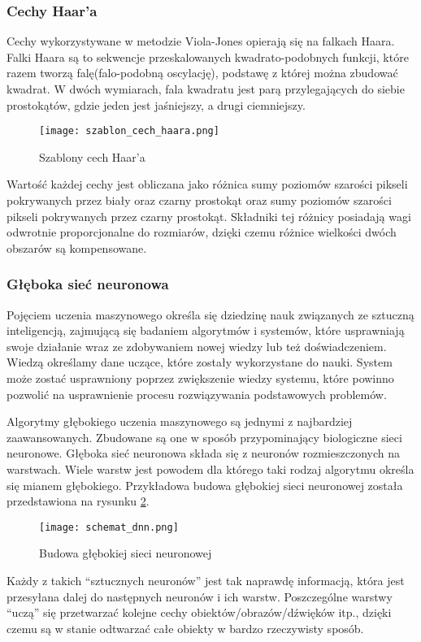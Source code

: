 \subsubsection{Cechy Haar'a}
Cechy wykorzystywane w metodzie Viola-Jones opierają się na falkach Haara. Falki Haara są to sekwencje przeskalowanych kwadrato-podobnych funkcji, które razem tworzą falę(falo-podobną oscylację), podstawę z której można zbudować kwadrat. W dwóch wymiarach, fala kwadratu jest parą przylegających do siebie prostokątów, gdzie jeden jest jaśniejszy, a drugi ciemniejszy.
\begin{figure}[H]
	\centering
	\texttt{[image: szablon\_cech\_haara.png]}
	\caption{Szablony cech Haar'a}
	\label{fig:szablon_cech_haara}
\end{figure}
Wartość każdej cechy jest obliczana jako różnica sumy poziomów szarości pikseli pokrywanych przez biały oraz czarny prostokąt oraz sumy poziomów szarości pikseli pokrywanych przez czarny prostokąt. Składniki tej różnicy posiadają wagi odwrotnie proporcjonalne do rozmiarów, dzięki czemu różnice wielkości dwóch obszarów są kompensowane.

\subsubsection{Głęboka sieć neuronowa} \label{dnn}
Pojęciem uczenia maszynowego określa się dziedzinę nauk związanych ze sztuczną inteligencją, zajmującą się badaniem algorytmów i systemów, które usprawniają swoje działanie wraz ze zdobywaniem nowej wiedzy lub też doświadczeniem. Wiedzą określamy dane uczące, które zostały wykorzystane do nauki. System może zostać usprawniony poprzez zwiększenie wiedzy systemu, które powinno pozwolić na usprawnienie procesu rozwiązywania podstawowych problemów.

Algorytmy głębokiego uczenia maszynowego są jednymi z najbardziej zaawansowanych. Zbudowane są one w sposób przypominający biologiczne sieci neuronowe. Głęboka sieć neuronowa składa się z neuronów rozmieszczonych na warstwach. Wiele warstw jest powodem dla którego taki rodzaj algorytmu określa się mianem głębokiego. Przykładowa budowa głębokiej sieci neuronowej została przedstawiona na rysunku \ref{fig:budowa_dnn}.
\begin{figure}[H]
	\centering
	\texttt{[image: schemat\_dnn.png]}
	\caption{Budowa głębokiej sieci neuronowej}
	\label{fig:budowa_dnn}
\end{figure}
Każdy z takich “sztucznych neuronów” jest tak naprawdę informacją, która jest przesyłana dalej do następnych neuronów i ich warstw. Poszczególne warstwy “uczą” się przetwarzać kolejne cechy obiektów/obrazów/dźwięków itp., dzięki czemu są w stanie odtwarzać całe obiekty w bardzo rzeczywisty sposób.

